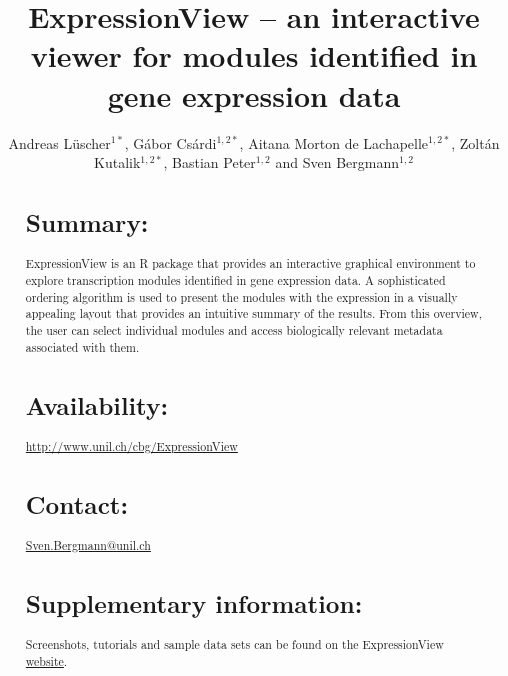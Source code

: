 \documentclass[round]{bioinfo}
\begin{document}
\application{}
\title[ExpressionView]{ExpressionView -- an interactive viewer for
  modules identified in gene expression data}
\author[Andreas L\"uscher, G\'abor Cs\'ardi, Aitana Morton de
Lachapelle, Zolt\'an Kutalik, and Sven Bergmann]{Andreas
  L\"uscher$^{1*}$, G\'abor Cs\'ardi$^{1,2*}$, Aitana Morton de
  Lachapelle$^{1,2*}$, Zolt\'an Kutalik$^{1,2*}$,
  Bastian Peter$^{1,2}$
  and Sven Bergmann$^{1,2}$}
\address{
  $^{1}$Swiss Institute of Bioinformatics, Lausanne, Switzerland\\
  $^{2}$Department of Medical Genetics, University of Lausanne,
  Lausanne, Switzerland\\
  *: equal contribution
}



\maketitle

\begin{abstract}
\section{Summary:}
ExpressionView is an R package that provides an interactive graphical
environment to explore transcription modules identified in gene expression
data. A sophisticated ordering algorithm is used to present the
modules with the expression in a visually appealing layout that provides an intuitive
summary of the results. From this overview, the user can select
individual modules and access biologically relevant metadata
associated with them.

\section{Availability:}
\url{http://www.unil.ch/cbg/ExpressionView}

\section{Contact:} \href{Sven.Bergmann@unil.ch}{Sven.Bergmann@unil.ch}

\section{Supplementary information:}
Screenshots, tutorials and sample data sets can be found on the
ExpressionView \href{http://www.unil.ch/cbg/ExpressionView}{website}.
\end{abstract}
\end{document}
